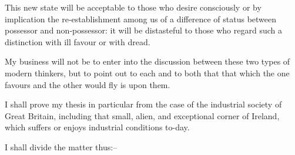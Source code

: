 \documentclass{book}
\begin{document}
This new state will be acceptable to those who desire consciously or by implication the re-establishment among us of a difference of status between possessor and non-possessor: it will be distasteful to those who regard such a distinction with ill favour or with dread.

My business will not be to enter into the discussion between these two types of modern thinkers, but to point out to each and to both that that which the one favours and the other would fly is upon them.

I shall prove my thesis in particular from the case of the industrial society of Great Britain, including that small, alien, and exceptional corner of Ireland, which suffers or enjoys industrial conditions to-day.

I shall divide the matter thus:–
\end{document}
